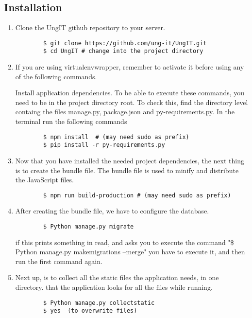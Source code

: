 \subsection{Installation}
\begin{enumerate}
    \item Clone the UngIT github repository to your server.    
    \begin{lstlisting}
        $ git clone https://github.com/ung-it/UngIT.git
        $ cd UngIT # change into the project directory
    \end{lstlisting}
    
    \item If you are using virtualenvwrapper, remember to activate it before using any of the following commands.
    
    Install application dependencies. To be able to execute these commands, you need to be in the project directory root. To check this, find the directory level containg the files manage.py, package.json and py-requirements.py. In the terminal run the following commands
    \begin{lstlisting}
        $ npm install  # (may need sudo as prefix)
        $ pip install -r py-requirements.py
    \end{lstlisting}
    
    \item Now that you have installed the needed project dependencies, the next thing is to create the bundle file. The bundle file is used to minify and distribute the JavaScript files.    
    \begin{lstlisting}
        $ npm run build-production # (may need sudo as prefix)
    \end{lstlisting}

    \item After creating the bundle file, we have to configure the database.
    \begin{lstlisting}
        $ Python manage.py migrate
    \end{lstlisting}
    
    if this prints something in read, and asks you to execute the command 
    "\$ Python manage.py makemigrations --merge"
    you have to execute it, and then run the first command again.   
    \item Next up, is to collect all the static files the application needs, in one directory. that the application looks for all the files while running.
    \begin{lstlisting}
        $ Python manage.py collectstatic
        $ yes  (to overwrite files)
    \end{lstlisting}
    

\end{enumerate}
